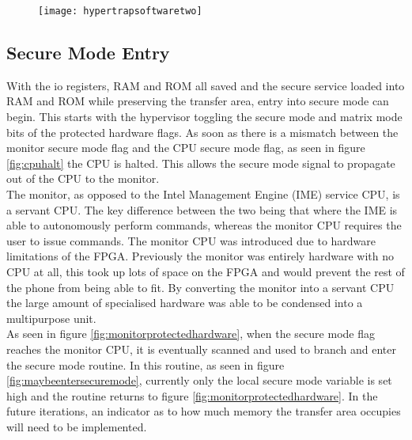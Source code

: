 \begin{figure}
  \centering
  \texttt{[image: hypertrapsoftwaretwo]}
  \caption{}
  \label{fig:hypertrapsoftwaretwo}
\end{figure}


\subsection{Secure Mode Entry}

\label{Ch6 Sec3 Sub3}

With the io registers, RAM and ROM all saved and the secure service loaded into RAM and ROM while preserving the transfer area, entry into secure mode can begin. This starts with the hypervisor toggling the secure mode and matrix mode bits of the protected hardware flags. As soon as there is a mismatch between the monitor secure mode flag and the CPU secure mode flag, as seen in figure \ref{fig:cpuhalt} the CPU is halted. This allows the secure mode signal to propagate out of the CPU to the monitor.\\

The monitor, as opposed to the Intel Management Engine (IME) service CPU, is a servant CPU. The key difference between the two being that where the IME is able to autonomously perform commands, whereas the monitor CPU requires the user to issue commands. The monitor CPU was introduced due to hardware limitations of the FPGA. Previously the monitor was entirely hardware with no CPU at all, this took up lots of space on the FPGA and would prevent the rest of the phone from being able to fit. By converting the monitor into a servant CPU the large amount of specialised hardware was able to be condensed into a multipurpose unit.\\

As seen in figure \ref{fig:monitorprotectedhardware}, when the secure mode flag reaches the monitor CPU, it is eventually scanned and used to branch and enter the secure mode routine. In this routine, as seen in figure \ref{fig:maybeentersecuremode}, currently only the local secure mode variable is set high and the routine returns to figure \ref{fig:monitorprotectedhardware}. In the future iterations, an indicator as to how much memory the transfer area occupies will need to be implemented.\\

